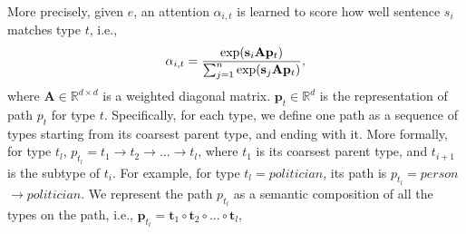 \documentclass[letterpaper]{article} %
\begin{document}
More precisely, given $e$, an attention $\alpha_{i,t}$ is learned to score how well sentence $s_i$ matches type $t$, i.e., %
\[
\alpha_{i,t} = \frac{\exp(\mathbf{s}_i\mathbf{A}\mathbf{p}_t)}{\sum_{j=1}^{n} \exp(\mathbf{s}_j\mathbf{A}\mathbf{p}_t)},
\vspace{-4pt}
\]
where $\mathbf{A} \in \mathbb{R}^{d \times d}$ is a weighted diagonal matrix. 
$\mathbf{p}_t \in \mathbb{R}^{d}$ is the representation of path $p_t$ for type $t$. 
Specifically, for each type, we define one path as a sequence of types starting from its coarsest parent type, and ending with it. %
More formally, for type $t_l$, $p_{t_l}=t_1$$\rightarrow$$t_2$$\rightarrow$$...$$\rightarrow$$t_l$, where $t_1$ is its coarsest parent type, and $t_{i+1}$ is the subtype of $t_{i}$. 
For example, for type $t_l=politician$, its path is $p_{t_l}=person$$\rightarrow$$politician$.
We represent the path $p_{t_l}$ as a semantic composition of all the types on the path, i.e., $\mathbf{p}_{t_l}=\mathbf{t}_1 \circ \mathbf{t}_2 \circ...\circ \mathbf{t}_l$, 
\end{document}
